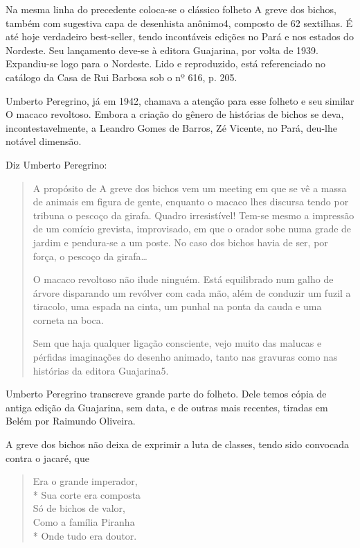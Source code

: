Na mesma linha do precedente coloca-se o clássico folheto A greve dos
bichos, também com sugestiva capa de desenhista anônimo4, composto de
62 sextilhas. É até hoje verdadeiro best-seller, tendo incontáveis
edições no Pará e nos estados do Nordeste. Seu lançamento deve-se à
editora Guajarina, por volta de 1939. Expandiu-se logo para o
Nordeste. Lido e reproduzido, está referenciado no catálogo da Casa
de Rui Barbosa sob o nº 616, p. 205.

Umberto Peregrino, já em 1942, chamava a atenção para esse folheto e
seu similar O macaco revoltoso. Embora a criação do gênero de
histórias de bichos se deva, incontestavelmente, a Leandro Gomes de
Barros, Zé Vicente, no Pará, deu-lhe notável dimensão.

Diz Umberto Peregrino:

\begin{quote}
A propósito de A greve dos bichos vem um meeting em que se vê a massa
de animais em figura de gente, enquanto o macaco lhes discursa tendo
por tribuna o pescoço da girafa. Quadro irresistível! Tem-se mesmo a
impressão de um comício grevista, improvisado, em que o orador sobe
numa grade de jardim e pendura-se a um poste. No caso dos bichos
havia de ser, por força, o pescoço da girafa\ldots{}

O macaco revoltoso não ilude ninguém. Está equilibrado num galho de
árvore disparando um revólver com cada mão, além de conduzir um fuzil
a tiracolo, uma espada na cinta, um punhal na ponta da cauda e uma
corneta na boca.

Sem que haja qualquer ligação consciente, vejo muito das malucas e
pérfidas imaginações do desenho animado, tanto nas gravuras como nas
histórias da editora Guajarina5. 
\end{quote}

Umberto Peregrino transcreve grande parte do folheto. Dele temos cópia
de antiga edição da Guajarina, sem data, e de outras mais recentes,
tiradas em Belém por Raimundo Oliveira. 

A greve dos bichos não deixa de exprimir a luta de classes, tendo sido
convocada contra o jacaré, que

\begin{verse}
Era o grande imperador,\\*
Sua corte era composta \\
Só de bichos de valor,\\		
Como a família Piranha\\*
Onde tudo era doutor.
\end{verse}

